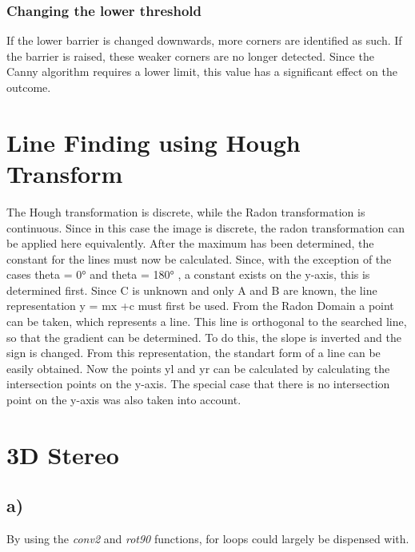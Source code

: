 \documentclass{article}
\begin{document}
	\subsubsection{Changing the lower threshold}If the lower barrier is changed downwards, more corners are identified as such. 
	If the barrier is raised, these weaker corners are no longer detected.
	Since the Canny algorithm requires a lower limit, this value has a significant effect on the outcome.

	\section{Line Finding using Hough Transform}

	The Hough transformation is discrete, while the Radon transformation is continuous. 
	Since in this case the image is discrete, the radon transformation can be applied here equivalently. After the maximum has been determined, the constant for the lines must now be calculated.
	Since, with the exception of the cases theta = 0° and theta = 180° , a constant exists on the y-axis, this is determined first.
	Since C is unknown and only A and B are known, the line representation y = mx +c must first be used. 
	From the Radon Domain a point can be taken, which represents a line. 
	This line is orthogonal to the searched line, so that the gradient can be determined. 
	To do this, the slope is inverted and the sign is changed. From this representation, the standart form of a line can be easily obtained.
	Now the points yl and yr can be calculated by calculating the intersection points on the y-axis.
	The special case that there is no intersection point on the y-axis was also taken into account.


	\section{3D Stereo}

	\subsection{a)} 
	By using the \textit{conv2} and \textit{rot90} functions, for loops could largely be dispensed with. 
	
	
	
\end{document}
